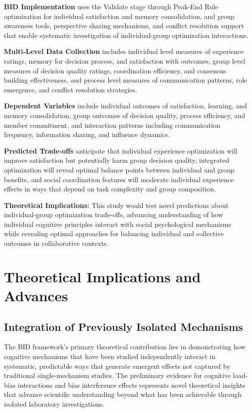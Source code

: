 \documentclass[
  authoryear,
  preprint]{elsarticle}
\begin{document}
\textbf{BID Implementation} uses the Validate stage through Peak-End
Rule optimization for individual satisfaction and memory consolidation,
and group awareness tools, perspective sharing mechanisms, and conflict
resolution support that enable systematic investigation of
individual-group optimization interactions.

\textbf{Multi-Level Data Collection} includes individual level measures
of experience ratings, memory for decision process, and satisfaction
with outcomes, group level measures of decision quality ratings,
coordination efficiency, and consensus building effectiveness, and
process level measures of communication patterns, role emergence, and
conflict resolution strategies.

\textbf{Dependent Variables} include individual outcomes of
satisfaction, learning, and memory consolidation, group outcomes of
decision quality, process efficiency, and member commitment, and
interaction patterns including communication frequency, information
sharing, and influence dynamics.

\textbf{Predicted Trade-offs} anticipate that individual experience
optimization will improve satisfaction but potentially harm group
decision quality, integrated optimization will reveal optimal balance
points between individual and group benefits, and social coordination
features will moderate individual experience effects in ways that depend
on task complexity and group composition.

\textbf{Theoretical Implications:} This study would test novel
predictions about individual-group optimization trade-offs, advancing
understanding of how individual cognitive principles interact with
social psychological mechanisms while revealing optimal approaches for
balancing individual and collective outcomes in collaborative contexts.

\section{Theoretical Implications and
Advances}\label{theoretical-implications-and-advances}

\subsection{Integration of Previously Isolated
Mechanisms}\label{integration-of-previously-isolated-mechanisms}

The BID framework's primary theoretical contribution lies in
demonstrating how cognitive mechanisms that have been studied
independently interact in systematic, predictable ways that generate
emergent effects not captured by traditional single-mechanism studies.
The preliminary evidence for cognitive load-bias interactions and bias
interference effects represents novel theoretical insights that advance
scientific understanding beyond what has been achievable through
isolated laboratory investigations.
\end{document}
